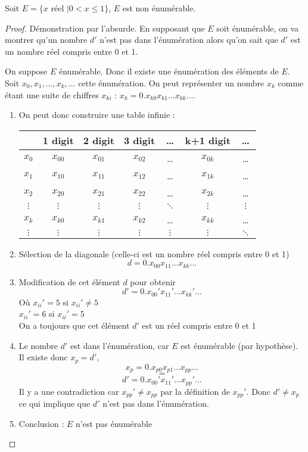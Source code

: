 \begin{mytheo}
	Soit $E = \{ x \text{ réel }| 0<x\leq1\}$, $E$ est non énumérable.

	\begin{proof}
		Démonstration par l'absurde.  En supposant que $E$ soit énumérable, on va montrer qu'un nombre $d'$ n'est pas dans l'énumération alors qu'on sait
		que $d'$ est un nombre réel compris entre 0 et 1.
		
		On suppose $E$ énumérable. Donc il existe une énumération des éléments de $E$.  Soit 
		$x_0, x_1,\dots,x_k,\dots$ cette énumération. On peut représenter un nombre $x_k$ comme étant une
		suite de chiffres $x_{ki}$ : $x_k = 0.x_{k0}x_{k1}\dots x_{kk}\dots$.
		
		\begin{enumerate}
			\item On peut donc construire une table infinie : \\
				\begin{tabular}{|c||c|c|c|c|c|c|}
					\hline
					& 1 digit & 2 digit & 3 digit & \dots & k+1 digit & \dots \\
					\hline
					$x_0$ & $x_{00}$ & $x_{01}$ & $x_{02}$ & \dots & $x_{0k}$ & \dots \\
					$x_1$ & $x_{10}$ & $x_{11}$ & $x_{12}$ & \dots & $x_{1k}$ & \dots \\
					$x_2$ & $x_{20}$ & $x_{21}$ & $x_{22}$ & \dots & $x_{2k}$ & \dots \\
					$\vdots$& $\vdots$& $\vdots$& $\vdots$& $\ddots$& $\vdots$& $\vdots$\\
					$x_k$ & $x_{k0}$ & $x_{k1}$ & $x_{k2}$ & \dots & $x_{kk}$ & \dots \\
					$\vdots$& $\vdots$& $\vdots$& $\vdots$& $\vdots$& $\vdots$& $\ddots$\\
					\hline
				\end{tabular}
			\item Sélection de la diagonale (celle-ci est un nombre réel compris
				entre 0 et 1)
				\[ d=0.x_{00}x_{11}\dots x_{kk}\dots \]
			\item Modification de cet élément $d$ pour obtenir
				\[ d'=0.x_{00}'x_{11}'\dots x_{kk}'\dots \]
				Où $x_{ii}'=5$ si $x_{ii}'\neq 5$ \\
				$x_{ii}'=6$ si $x_{ii}'= 5$ \\
				On a toujours que cet élément $d'$ est un réel compris entre 0 et 1
			\item Le nombre $d'$ est dans l'énumération, car $E$ est
				énumérable (par hypothèse). Il existe donc $x_p=d'$,
				\[ x_p=0.x_{p0}x_{p1}\dots x_{pp}\dots \]
				\[=\]
				\[ d'=0.x_{00}'x_{11}'\dots x_{pp}'\dots \]
				Il y a une contradiction car $x_{pp}' \neq
			       	x_{pp}$ par la définition de $x_{pp}'$. Donc $d' \neq x_p$ ce qui implique que $d'$ n'est pas
				dans l'énumération.
			\item Conclusion : $E$ n'est pas énumérable
		
		\end{enumerate}
	\end{proof}
\end{mytheo}

